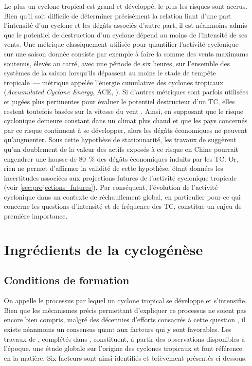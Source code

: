 \documentclass[../main.tex]{subfiles}
\begin{document}
Le plus un cyclone tropical est grand et développé, le plus les risques sont accrus. Bien qu'il soit difficile de déterminer précisément la relation liant d'une part l'intensité d'un cyclone et les dégâts associés d'autre part, il est néanmoins admis que le potentiel de destruction d'un cyclone dépend au moins de l'intensité de ses vents. Une métrique classiquement utilisée pour quantifier l'activité cyclonique sur une saison donnée consiste par exemple à faire la somme des vents
maximums soutenus, élevés au carré, avec une période de six heures, sur l'ensemble des systèmes de la saison lorsqu'ils dépassent au moins le stade de tempête tropicale~--- métrique appelée l'énergie cumulative des cyclones tropicaux (\textit{Accumulated Cyclone Energy}, ACE, \cite{bell_climate_2000}). Si d'autres métriques sont parfois utilisées et jugées plus pertinentes pour évaluer le potentiel destructeur d'un TC, elles restent toutefois basées sur la vitesse du vent
\parencite{powell_tropical_2007}. Ainsi, en supposant que le risque cyclonique demeure constant dans un climat plus chaud et que les pays concernés par ce risque continuent à se développer, alors les dégâts économiques ne peuvent
qu'augmenter. Sous cette hypothèse de stationnarité, les travaux de \cite{ye_dependence_2020} suggèrent qu'un doublement de la valeur des actifs exposés à ce risque en Chine pourrait engendrer une hausse de \SI{80}{\percent} des dégâts économiques induits par les TC. Or, rien ne permet d'affirmer la validité de cette hypothèse, étant données les incertitudes associées aux projections futures de l'activité cyclonique tropicale (voir \cref{sec:projections_futures}). Par conséquent,
l'évolution de l'activité cyclonique dans un contexte de réchauffement global, en particulier pour ce qui concerne les questions d'intensité et de fréquence des TC, constitue un enjeu de première importance.

\section{Ingrédients de la cyclogénèse}
  
\subsection{Conditions de formation}\label{sec:conditions_cyclogenese}

On appelle  le processus par lequel un cyclone tropical se développe et s'intensifie. Bien que les mécanismes précis permettant d'expliquer ce processus ne soient pas encore bien compris, malgré des décennies d'efforts consacrés à cette question \parencite{yanai_formation_1964, montgomery_tropical_1993, gray_formation_1998, tory_tropical_2010}, il existe néanmoins un consensus quant aux facteurs qui y sont favorables. Les travaux de \cite{gray_global_1968}, complétés dans
\cite{gray_tropical_1975}, constituent, à partir des observations disponibles à l'époque, une étude globale sur l'origine des cyclones tropicaux et font référence en la matière. Six facteurs sont ainsi identifiés et brièvement présentés ci-dessous.
\end{document}
